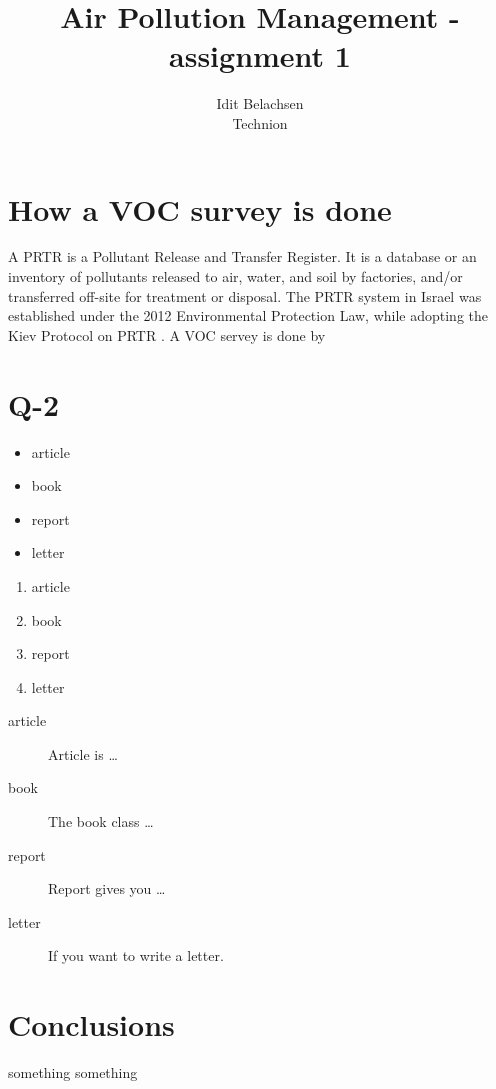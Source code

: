 \documentclass[a4paper,fontsize=12pt]{article}
\title{Air Pollution Management - assignment 1}
\author{Idit Belachsen  \\ Technion  \\}
\begin{document}
	\maketitle
	
	\section{How a VOC survey is done}
	A PRTR is a Pollutant Release and Transfer Register. It is a database or an inventory of pollutants released to air, water, and soil by factories, and/or transferred off-site for treatment or disposal. The PRTR system in Israel was established under the 2012 Environmental Protection Law, while adopting the Kiev Protocol on PRTR \cite{IsraelMinistryEnvProt}. 
	\newline
	\newline
	A VOC servey is done by 
	\newline

	
	\section{Q-2} \label{documentclasses}
	
	\begin{itemize}
		\item article
		\item book 
		\item report 
		\item letter 
	\end{itemize}
	
	
	\begin{enumerate}
		\item article
		\item book 
		\item report 
		\item letter 
	\end{enumerate}
	
	\begin{description}
		\item[article\label{article}]{Article is \ldots}
		\item[book\label{book}]{The book class \ldots}
		\item[report\label{report}]{Report gives you \ldots}
		\item[letter\label{letter}]{If you want to write a letter.}
	\end{description}
	
	
	\section{Conclusions}\label{conclusions}
	
	something something \cite{Lerner2015}
	
	
	
\end{document}
